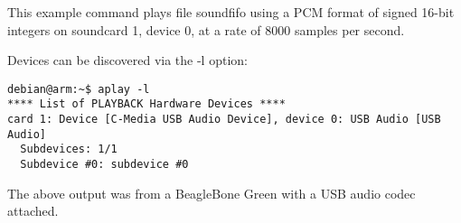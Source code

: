 This example command plays file soundfifo using a PCM format of signed 16-bit integers on soundcard 1, device 0, at a rate of 8000 samples per second.

Devices can be discovered via the -l option:

\begin{verbatim}
debian@arm:~$ aplay -l
**** List of PLAYBACK Hardware Devices ****
card 1: Device [C-Media USB Audio Device], device 0: USB Audio [USB Audio]
  Subdevices: 1/1
  Subdevice #0: subdevice #0
\end{verbatim}

The above output was from a BeagleBone Green with a USB audio codec attached.







